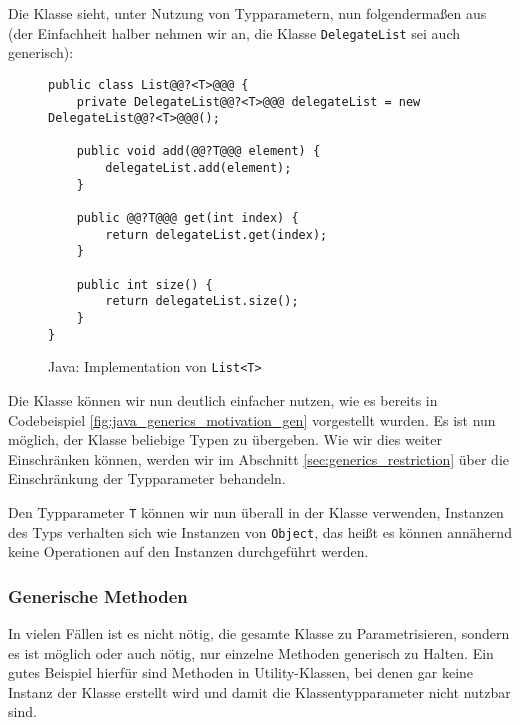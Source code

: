 		Die Klasse sieht, unter Nutzung von Typparametern, nun folgendermaßen aus (der Einfachheit halber nehmen wir an, die Klasse \texttt{DelegateList} sei auch generisch):
		\begin{figure}[H]
			\centering
			\begin{lstlisting}
public class List@@?<T>@@@ {
	private DelegateList@@?<T>@@@ delegateList = new DelegateList@@?<T>@@@();
	
	public void add(@@?T@@@ element) {
		delegateList.add(element);
	}
	
	public @@?T@@@ get(int index) {
		return delegateList.get(index);
	}
	
	public int size() {
		return delegateList.size();
	}
}
			\end{lstlisting}
			\caption{Java: Implementation von \texttt{List<T>}}
		\end{figure}
		
		Die Klasse können wir nun deutlich einfacher nutzen, wie es bereits in Codebeispiel \ref{fig:java_generics_motivation_gen} vorgestellt wurden. Es ist nun möglich, der Klasse beliebige Typen zu übergeben. Wie wir dies weiter Einschränken können, werden wir im Abschnitt \ref{sec:generics_restriction} über die Einschränkung der Typparameter behandeln.
		
		Den Typparameter \texttt{T} können wir nun überall in der Klasse verwenden, Instanzen des Typs verhalten sich wie Instanzen von \texttt{Object}, das heißt es können annähernd keine Operationen auf den Instanzen durchgeführt werden.
		
		
	
	\subsubsection{Generische Methoden}
		In vielen Fällen ist es nicht nötig, die gesamte Klasse zu Parametrisieren, sondern es ist möglich oder auch nötig, nur einzelne Methoden generisch zu Halten. Ein gutes Beispiel hierfür sind Methoden in Utility-Klassen, bei denen gar keine Instanz der Klasse erstellt wird und damit die Klassentypparameter nicht nutzbar sind.
		
